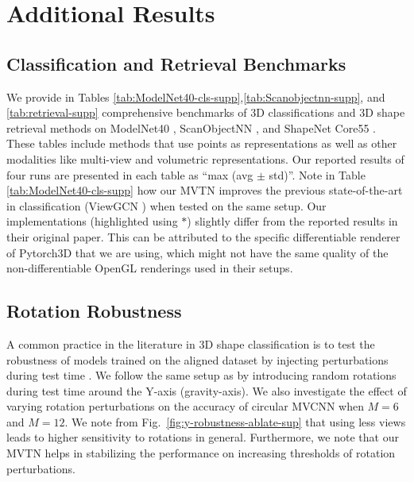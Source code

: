 \documentclass[10pt,twocolumn,letterpaper]{article}
\newcommand{\figLabel}{Fig.~}
\begin{document}
\clearpage \clearpage
\section{Additional Results}

\subsection{Classification and Retrieval Benchmarks}
We provide in Tables \ref{tab:ModelNet40-cls-supp},\ref{tab:Scanobjectnn-supp}, and \ref{tab:retrieval-supp} comprehensive benchmarks of 3D classifications and 3D shape retrieval methods on ModelNet40 \cite{modelnet}, ScanObjectNN \cite{scanobjectnn}, and ShapeNet Core55 \cite{shapenet,shrek17}. These tables include methods that use points as representations as well as other modalities like multi-view and volumetric representations. Our reported results of four runs are presented in each table as ``max (avg $\pm$ std)''.  Note in Table \ref{tab:ModelNet40-cls-supp} how our MVTN improves the previous state-of-the-art in classification (ViewGCN \cite{mvviewgcn}) when tested on the same setup. Our implementations (highlighted using $*$) slightly differ from the reported results in their original paper. This can be attributed to the specific differentiable renderer of Pytorch3D \cite{pytorch3d} that we are using, which might not have the same quality of the non-differentiable OpenGL renderings \cite{opengl} used in their setups.       






\subsection{Rotation Robustness}
A common practice in the literature in 3D shape classification is to test the robustness of models trained on the aligned dataset by injecting perturbations during test time \cite{rspointcloud}. We follow the same setup as \cite{rspointcloud} by introducing random rotations during test time around the Y-axis (gravity-axis).
We also investigate the effect of varying rotation perturbations on the accuracy of circular MVCNN when $M=6$ and $M=12$. We note from \figLabel{\ref{fig:y-robustness-ablate-sup}} that using less views leads to higher sensitivity to rotations in general. Furthermore, we note that our MVTN helps in stabilizing the performance on increasing thresholds of rotation perturbations.     
\end{document}
